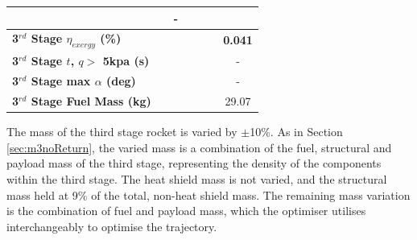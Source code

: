\begin{table}[ht]
\begin{tabular}{l c c c c c c}
		& \returnFuelmThreeOneHundredTen
		& -
		\\
		\hline 
		\textbf{3$^{rd}$ Stage $\eta_{exergy}$ (\%)}
		& \textbf{\thirddExergyEffmThreeNinety}
		& \textbf{\thirddExergyEffmThreeNinetyFive}
		& \textbf{\thirddExergyEffmThreeStandard}
		& \textbf{\thirddExergyEffmThreeOneHundredFive}
		& \textbf{\thirddExergyEffmThreeOneHundredTen}
		& \textbf{0.041}
		\\
		\textbf{3$^{rd}$ Stage $t$, $q >$ 5kpa (s)}
		& \thirdqOverFivemThreeNinety
		& \thirdqOverFivemThreeNinetyFive
		& \thirdqOverFivemThreeStandard
		& \thirdqOverFivemThreeOneHundredFive
		& \thirdqOverFivemThreeOneHundredTen
		& -
		\\
		\textbf{3$^{rd}$ Stage max $\alpha$ (deg)}
		& \thirdmaxAoAmThreeNinety
		& \thirdmaxAoAmThreeNinetyFive
		& \thirdmaxAoAmThreeStandard
		& \thirdmaxAoAmThreeOneHundredFive
		& \thirdmaxAoAmThreeOneHundredTen
		& -
		\\
		\textbf{3$^{rd}$ Stage Fuel Mass (kg)}
		& \thirdmFuelmThreeNinety
		& \thirdmFuelmThreeNinetyFive
		& \thirdmFuelmThreeStandard
		& \thirdmFuelmThreeOneHundredFive
		& \thirdmFuelmThreeOneHundredTen
		&29.07
		\\
		\hline 
	\end{tabular} 
\end{table}

The mass of the third stage rocket is varied by $\pm$10\%. As in Section \ref{sec:m3noReturn}, the varied mass is a combination of the fuel, structural and payload mass of the third stage, representing the density of the components within the third stage. The heat shield mass is not varied, and the structural mass held at 9\% of the total, non-heat shield mass. The remaining mass variation is the combination of fuel and payload mass, which the optimiser utilises interchangeably to optimise the trajectory.

